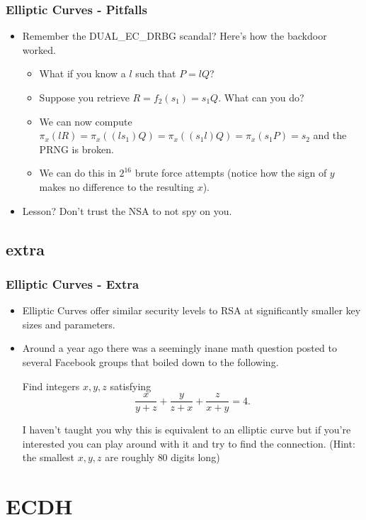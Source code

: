\documentclass[aspectratio=169,t]{beamer}
\begin{document}
\begin{frame}
\frametitle{Elliptic Curves - Pitfalls}
\begin{itemize}
\item
Remember the DUAL\_EC\_DRBG scandal? Here's how the backdoor worked.
\begin{itemize}
\item
What if you know a $l$ such that $P = lQ$?
\item
Suppose you retrieve $R = f_2(s_1) = s_1 Q$. What can you do? \pause
\item
We can now compute $\pi_x(lR) = \pi_x ((l s_1) Q) = \pi_x ((s_1 l) Q) = \pi_x
(s_1 P) = s_2$ and the PRNG is broken. \pause
\item
We can do this in $2^{16}$ brute force attempts (notice how the sign of $y$
makes no difference to the resulting $x$).
\end{itemize}
\pause
\item
Lesson? Don't trust the NSA to not spy on you.
\end{itemize}
\end{frame}

\subsection{extra}
\begin{frame}
\frametitle{Elliptic Curves - Extra}
\begin{itemize}
\item
Elliptic Curves offer similar security levels to RSA at significantly smaller
key sizes and parameters.
\item
Around a year ago there was a seemingly inane math question posted to several
Facebook groups that boiled down to the following.

Find integers $x, y, z$ satisfying
\[ \frac{x}{y + z} + \frac{y}{z + x} + \frac{z}{x + y} = 4. \]

I haven't taught you why this is equivalent to an elliptic curve but if you're
interested you can play around with it and try to find the connection. (Hint:
the smallest $x, y, z$ are roughly $80$ digits long)
\end{itemize}
\end{frame}

\section{ECDH}
\end{document}
